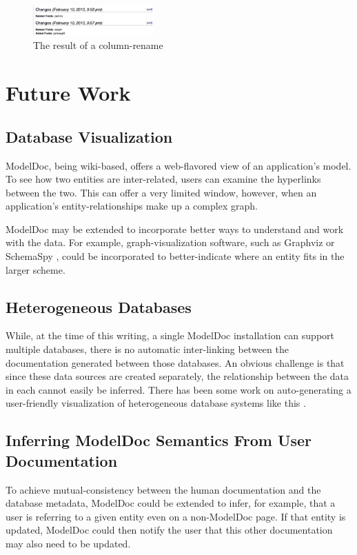\documentclass[nocopyrightspace]{acm_proc_article-sp}
\begin{document}
\begin{figure}[h]
\centering
\includegraphics[width=175px]{rename.pdf}
\caption{The result of a column-rename}
\end{figure}

\section{Future Work}

\subsection{Database Visualization}

ModelDoc, being wiki-based, offers a web-flavored view of an application's
model.  To see how two entities are inter-related, users can examine the
hyperlinks between the two.  This can offer a very limited window, however,
when an application's entity-relationships make up a complex graph.

ModelDoc may be extended to incorporate better ways to understand and work with
the data.  For example, graph-visualization software, such as Graphviz
\cite{web:graphviz} or SchemaSpy \cite{web:schemaspy}, could be incorporated to
better-indicate where an entity fits in the larger scheme.

\subsection{Heterogeneous Databases}

While, at the time of this writing, a single ModelDoc installation can support
multiple databases, there is no automatic inter-linking between the
documentation generated between those databases.  An obvious challenge is that
since these data sources are created separately, the relationship between the
data in each cannot easily be inferred.  There has been
some work on auto-generating a user-friendly visualization of heterogeneous
database systems like this \cite{catarci:heterogeneous}.

\subsection{Inferring ModelDoc Semantics From User Documentation}

To achieve mutual-consistency between the human documentation and the database
metadata, ModelDoc could be extended to infer, for example, that a user is
referring to a given entity even on a non-ModelDoc page.  If that entity
is updated, ModelDoc could then notify the user that this other
documentation may also need to be updated.
\end{document}
